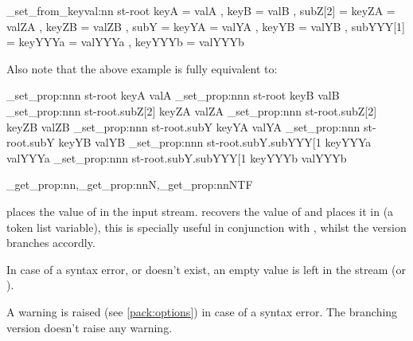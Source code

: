 \documentclass[10pt]{article}
\begin{document}
\begin{codestore}[store-env=keyval.demo8]
\starray_set_from_keyval:nn {st-root} 
  {
    keyA = valA ,
    keyB = valB ,
    subZ[2] = 
      {
        keyZA = valZA ,
        keyZB = valZB ,
      }
    subY  =
      {
        keyYA = valYA ,
        keyYB = valYB ,
        subYYY[1] =
          {
            keyYYYa = valYYYa ,
            keyYYYb = valYYYb 
          }
      }
  }  
\end{codestore}


Also note that the above example is fully equivalent to:

\begin{codestore}[store-env=keyval.demo9]
\starray_set_prop:nnn {st-root} {keyA} {valA}
\starray_set_prop:nnn {st-root} {keyB} {valB}
\starray_set_prop:nnn {st-root.subZ[2]} {keyZA} {valZA}
\starray_set_prop:nnn {st-root.subZ[2]} {keyZB} {valZB}
\starray_set_prop:nnn {st-root.subY} {keyYA} {valYA}
\starray_set_prop:nnn {st-root.subY} {keyYB} {valYB}
\starray_set_prop:nnn {st-root.subY.subYYY[1} {keyYYYa} {valYYYa}
\starray_set_prop:nnn {st-root.subY.subYYY[1} {keyYYYb} {valYYYb}
\end{codestore}


\begin{codedescribe}{\starray_get_prop:nn,\starray_get_prop:nnN,\starray_get_prop:nnNTF}
\begin{codesyntax}%
\end{codesyntax}
 places the value of  in the input stream.\break
{} recovers the value of  and places it in  (a token list variable), this is specially useful in conjunction with , whilst the  version branches accordly.
\end{codedescribe}
\begin{tsremark}
In case of a syntax error, or  doesn't exist, an empty value is left in the stream (or ).
\end{tsremark}
\begin{tsremark}
A warning is raised (see \ref{pack:options}) in case of a  syntax error. The branching version doesn't raise any warning.
\end{tsremark}
\end{document}
